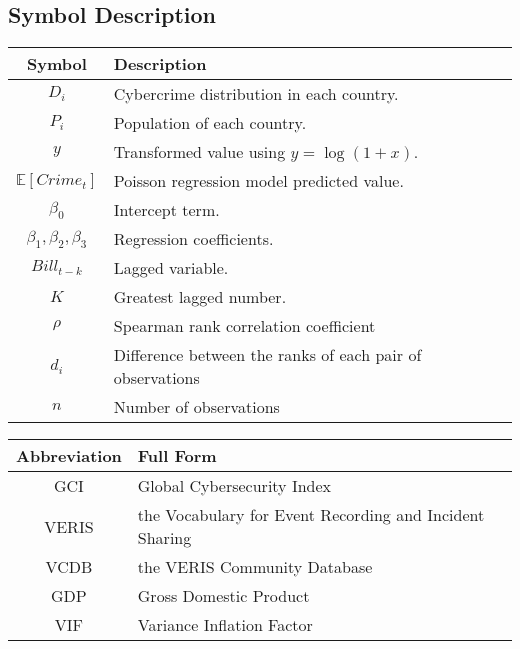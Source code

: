 
\subsection{Symbol Description}\label{subsec:symbol-description} %
\begin{center}
    \begin{tabular}{cl}
        \hline
        \textbf{Symbol} & \textbf{Description} \\
        \hline
        $D_i$                     & Cybercrime distribution in each country. \\
        $P_i$                     & Population of each country. \\
        $y$                       & Transformed value using \( y = \log(1 + x) \). \\
        $\mathbb{E}[Crime_t]$     & Poisson regression model predicted value. \\
        $\beta_0$                 & Intercept term. \\
        $\beta_1,\beta_2,\beta_3$ & Regression coefficients. \\
        $Bill_{t-k}$              & Lagged variable. \\
        $K$                       & Greatest lagged number. \\
        $\rho$                    & Spearman rank correlation coefficient \\
        $d_i$                     & Difference between the ranks of each pair of observations \\
        $n$                       & Number of observations \\
        \hline
    \end{tabular}

    \bigskip

    \noindent
    \begin{tabular}{cl}
        \hline
        \textbf{Abbreviation} & \textbf{Full Form} \\
        \hline
        GCI   & Global Cybersecurity Index\cite{gci-2024} \\
        VERIS & the Vocabulary for Event Recording and Incident Sharing\cite{veris} \\
        VCDB  & the VERIS Community Database\cite{vcdb} \\
        GDP   & Gross Domestic Product \\
        VIF   & Variance Inflation Factor \\
        \hline
    \end{tabular}

\end{center}

